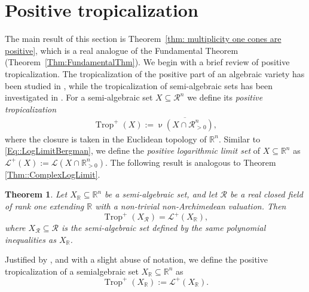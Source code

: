 \documentclass{article}
\newtheorem{theorem}{Theorem}[section]
\theoremstyle{definition}
\DeclareMathOperator{\val}{\nu}
\DeclareMathOperator{\Trop}{Trop}
\newcommand{\R}{\mathbb{R}}
\newcommand{\RR}{\mathcal{R}}
\newcommand{\LL}{\mathcal{L}}
\begin{document}
\section{Positive tropicalization}
\label{Section:PositiveTrop}
The main result of this section is Theorem~\ref{thm: multiplicity one cones are positive}, which is a real analogue of the Fundamental Theorem (Theorem~\ref{Thm:FundamentalThm}). We begin with a brief review of positive tropicalization.
\color{black}
The tropicalization of the positive part of an algebraic variety has been studied in \cite{SpeyerWilliams::PosGrassmannian,ARDILA2006577,Vinzant::RealRadical,Tabera::Bases,Brandenburg::TropicalPositivity}, while the tropicalization of semi-algebraic sets has been investigated in \cite{Alessandrini::LogLimit,Allamigeon::TropSpecta,JellScheidererYu::RealTrop,Blekherman::Moments}. For a semi-algebraic set $X \subseteq \mathcal{R}^n$ we define its  \emph{positive tropicalization}
\begin{align}
\label{Def:PosTrop}
 \Trop^+(X) := \overline{ \val( X \cap \mathcal{R}_{>0}^n) },
 \end{align}
where the closure is taken in the Euclidean topology of $\mathbb{R}^n$.
Similar to \eqref{Eq::LogLimitBergman}, we define the \emph{positive logarithmic limit set} of $X \subseteq \mathbb{R}^n$ as $\LL^+(X ) := \LL(X \cap \mathbb{R}_{>0}^n)$. The following result is analogous to Theorem \ref{Thm::ComplexLogLimit}. 

\begin{theorem} 
\label{Thm::PosLogLimit}
\cite[Corollary 4.6]{Alessandrini::LogLimit} 
Let $X_\R \subseteq \mathbb{R}^n$ be a semi-algebraic set, and let $\mathcal{R}$ be a real closed  field  of rank one extending $\mathbb{R}$ with a non-trivial non-Archimedean valuation. Then
\[\Trop^+(X_\RR) = \LL^+(X_\R),\]
where $X_\RR \subseteq \mathcal{R}$ is the semi-algebraic set defined by the same polynomial inequalities as $X_\R$.
\end{theorem}

Justified by , and with a slight abuse of notation, we define the positive tropicalization of a semialgebraic set $X_{\mathbb{R}} \subseteq \mathbb{R}^n$ as
\[ \Trop^+(X_\R) := \LL^+(X_\R).\]
\end{document}
